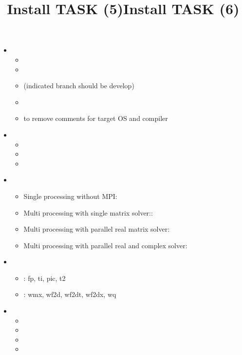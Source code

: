 \documentclass[12pt]{article}
\begin{document}
\title{Install TASK (5)}
\begin{itemize}
\item
{}
\begin{itemize}
\item
{}
\item
{}
\item
{} \quad (indicated branch should be develop)
\item
{}
\item
{} to remove comments for target OS and compiler
\end{itemize}
\item
{}
\begin{itemize}
\item
{}
\item
{}
\item
{}
\end{itemize}
\end{itemize}

\title{Install TASK (6)}
\begin{itemize}
\item
{}
\begin{itemize}
\item
  Single processing without MPI: 
\item
  Multi processing with single matrix solver:: 
\item
  Multi processing with parallel real matrix solver: 
\item
  Multi processing with parallel real and complex solver: \\
\end{itemize}
\item
  \begin{itemize}
  \item
    : fp, ti, pic, t2
  \item
    : wmx, wf2d, wf2dt, wf2dx, wq
  \end{itemize}
\item
  \begin{itemize}
  \item
  \item
  \item
  \item
  \end{itemize}
\end{itemize}
\end{document}
